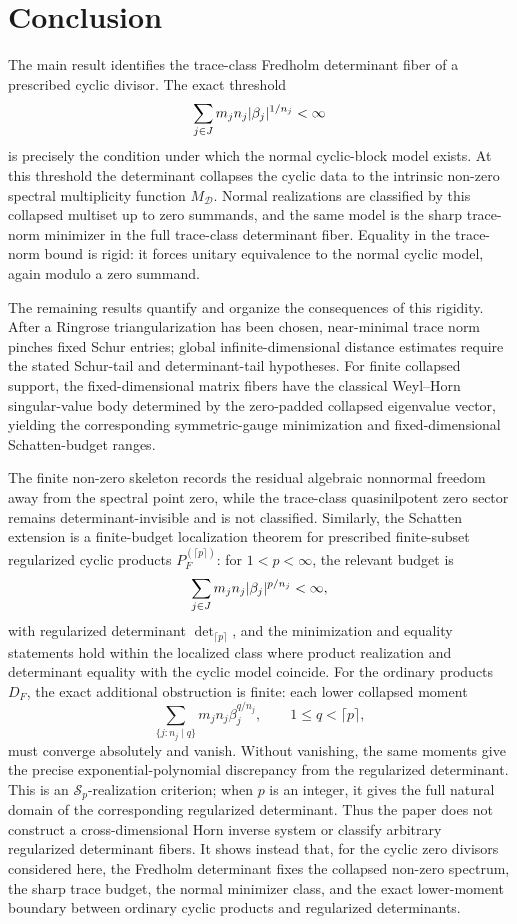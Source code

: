 \section{Conclusion}\label{sec:conclusion}

The main result identifies the trace-class Fredholm determinant fiber of a
prescribed cyclic divisor.  The exact threshold
\[
  \sum_{j\in J}m_jn_j\lvert \beta_j \rvert^{1/n_j}<\infty
\]
is precisely the condition under which the normal cyclic-block model exists.
At this threshold the determinant collapses the cyclic data to the intrinsic
non-zero spectral multiplicity function \(M_{\mathcal D}\).  Normal
realizations are classified by this collapsed multiset up to zero summands, and
the same model is the sharp trace-norm minimizer in the full trace-class
determinant fiber.  Equality in the trace-norm bound is rigid: it forces
unitary equivalence to the normal cyclic model, again modulo a zero summand.

The remaining results quantify and organize the consequences of this rigidity.
After a Ringrose triangularization has been chosen, near-minimal trace norm
pinches fixed Schur entries; global infinite-dimensional distance estimates
require the stated Schur-tail and determinant-tail hypotheses.  For finite
collapsed support, the fixed-dimensional matrix fibers have the classical
Weyl--Horn singular-value body determined by the zero-padded collapsed
eigenvalue vector, yielding the corresponding symmetric-gauge minimization and
fixed-dimensional Schatten-budget ranges.

The finite non-zero skeleton records the residual algebraic nonnormal freedom
away from the spectral point zero, while the trace-class quasinilpotent zero
sector remains determinant-invisible and is not classified.  Similarly, the
Schatten extension is a finite-budget localization theorem for prescribed
finite-subset regularized cyclic products \(P_F^{(\lceil p\rceil)}\): for
\(1<p<\infty\), the relevant budget is
\[
  \sum_{j\in J}m_jn_j\lvert \beta_j \rvert^{p/n_j}<\infty,
\]
with regularized determinant \(\det_{\lceil p\rceil}\), and the minimization and
equality statements hold within the localized class where product realization
and determinant equality with the cyclic model coincide.  For the ordinary
products \(D_F\), the exact additional obstruction is finite: each lower
collapsed moment
\[
  \sum_{\{j:n_j\mid q\}}m_jn_j\beta_j^{q/n_j},
  \qquad 1\le q<\lceil p\rceil,
\]
must converge absolutely and vanish.  Without vanishing, the same moments give
the precise exponential-polynomial discrepancy from the regularized
determinant.  This is an \(\mathcal S_p\)-realization criterion; when \(p\) is
an integer, it gives the full natural domain of the corresponding regularized
determinant.  Thus the paper does not construct a cross-dimensional Horn
inverse system or classify arbitrary regularized determinant fibers.  It
shows instead that, for the cyclic zero divisors considered here, the Fredholm
determinant fixes the collapsed non-zero spectrum, the sharp trace budget, the
normal minimizer class, and the exact lower-moment boundary between ordinary
cyclic products and regularized determinants.

